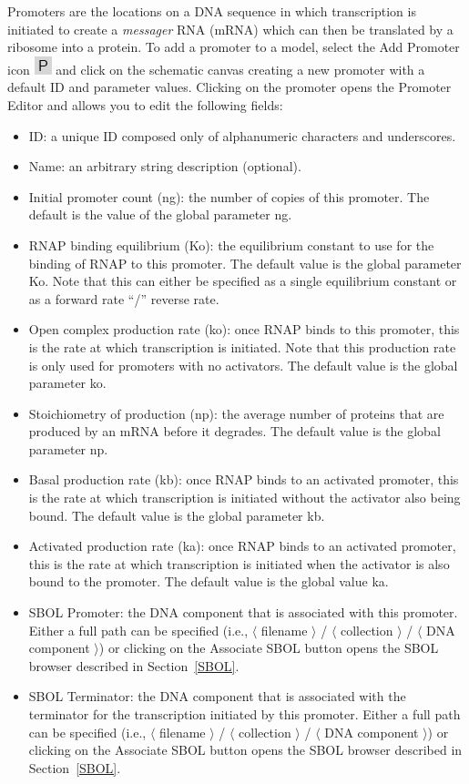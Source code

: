 \documentclass[titlepage,11pt]{article}
\begin{document}
Promoters are the locations on a DNA sequence in which transcription is initiated to create a \emph{messager} RNA (mRNA) which can then be translated by a ribosome into a protein.  To add a promoter to a model, select the Add Promoter icon \includegraphics{../gui/icons/modelview/promoter_mode_selected} and click on the schematic canvas creating a new promoter with a default ID and parameter values.  Clicking on the promoter opens the Promoter Editor and allows you to edit the following fields:
\begin{itemize}
\item ID: a unique ID composed only of alphanumeric characters and underscores.
\item Name: an arbitrary string description (optional).
\item Initial promoter count (ng): the number of copies of this promoter.  The default is the value of the global parameter ng.   
\item RNAP binding equilibrium (Ko): the equilibrium constant to use for the binding of RNAP to this promoter.  The default value is the global parameter Ko.  Note that this can either be specified as a single equilibrium constant or as a forward rate ``/'' reverse rate.
\item Open complex production rate (ko): once RNAP binds to this promoter, this is the rate at which transcription is initiated.  Note that this production rate is only used for promoters with no activators.  The default value is the global parameter ko.
\item Stoichiometry of production (np): the average number of proteins that are produced by an mRNA before it degrades.  The default value is the global parameter np.
\item Basal production rate (kb): once RNAP binds to an activated promoter, this is the rate at which transcription is initiated without the activator also being bound.  The default value is the global parameter kb.
\item Activated production rate (ka): once RNAP binds to an activated promoter, this is the rate at which transcription is initiated when the activator is also bound to the promoter.  The default value is the global value ka.
\item SBOL Promoter: the DNA component that is associated with this promoter.     Either a full path can be specified (i.e., $\langle$ filename $\rangle$ / $\langle$ collection $\rangle$ / $\langle$ DNA component $\rangle$) or clicking on the Associate SBOL button opens the SBOL browser described in Section~\ref{SBOL}.
\item SBOL Terminator: the DNA component that is associated with the terminator for the transcription initiated by this promoter.     Either a full path can be specified (i.e., $\langle$ filename $\rangle$ / $\langle$ collection $\rangle$ / $\langle$ DNA component $\rangle$) or clicking on the Associate SBOL button opens the SBOL browser described in Section~\ref{SBOL}.
\end{itemize}
\end{document}
